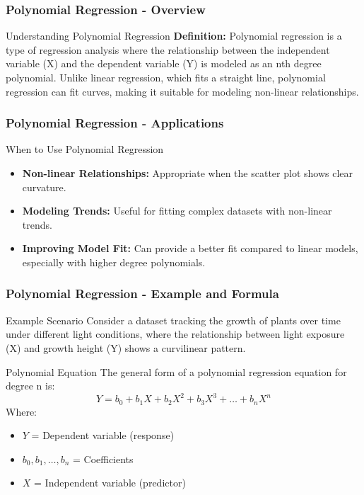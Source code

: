 \documentclass{beamer}
\begin{document}
\begin{frame}[fragile]
    \frametitle{Polynomial Regression - Overview}
    \begin{block}{Understanding Polynomial Regression}
        \textbf{Definition:}
        Polynomial regression is a type of regression analysis where the relationship between the independent variable (X) and the dependent variable (Y) is modeled as an nth degree polynomial. Unlike linear regression, which fits a straight line, polynomial regression can fit curves, making it suitable for modeling non-linear relationships.
    \end{block}
\end{frame}

\begin{frame}[fragile]
    \frametitle{Polynomial Regression - Applications}
    \begin{block}{When to Use Polynomial Regression}
        \begin{itemize}
            \item \textbf{Non-linear Relationships:} Appropriate when the scatter plot shows clear curvature.
            \item \textbf{Modeling Trends:} Useful for fitting complex datasets with non-linear trends.
            \item \textbf{Improving Model Fit:} Can provide a better fit compared to linear models, especially with higher degree polynomials.
        \end{itemize}
    \end{block}
\end{frame}

\begin{frame}[fragile]
    \frametitle{Polynomial Regression - Example and Formula}
    \begin{block}{Example Scenario}
        Consider a dataset tracking the growth of plants over time under different light conditions, where the relationship between light exposure (X) and growth height (Y) shows a curvilinear pattern.
    \end{block}

    \begin{block}{Polynomial Equation}
        The general form of a polynomial regression equation for degree n is:
        \begin{equation} 
            Y = b_0 + b_1X + b_2X^2 + b_3X^3 + \ldots + b_nX^n 
        \end{equation}
        Where:
        \begin{itemize}
            \item \(Y\) = Dependent variable (response)
            \item \(b_0, b_1, \ldots, b_n\) = Coefficients
            \item \(X\) = Independent variable (predictor)
        \end{itemize}
    \end{block}
\end{frame}
\end{document}
